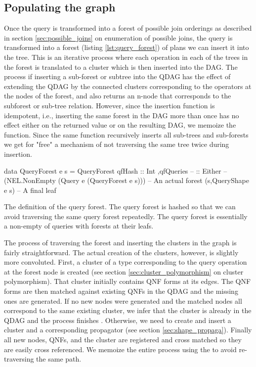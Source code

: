 \subsection{Populating the graph}

Once the query is transformed into a forest of possible join orderings as described
in section \ref{sec:possible_joins} on enumeration of possible joins, the query
is transformed into a forest (listing \ref{lst:query_forest}) of plans we
can insert it into the tree. This is an iterative process where each
operation in each of the trees in the forest is translated to a
cluster which is then inserted into the DAG. The process if inserting
a sub-forest or subtree into the QDAG has
the effect of extending the QDAG by the connected clusters
corresponding to the operators at the nodes of the forest, and also
returns an n-node that corresponds to the subforest or sub-tree
relation. However, since the insertion function is idempotent, i.e.,
inserting the same forest in the DAG more than once has no effect
either on the returned value or on the resulting DAG, we memoize the
function. Since the same function recursively inserts all sub-trees
and sub-forests we get for "free" a mechanism of not traversing the
same tree twice during insertion.

\begin{code}
  \begin{haskellcode}
    data QueryForest e s =
      QueryForest
      { qfHash :: Int
        ,qfQueries --
        :: Either --
        (NEL.NonEmpty (Query e (QueryForest e s))) -- An actual forest
        (s,QueryShape e s) -- A final leaf
      }
  \end{haskellcode}
  \label{lst:query_forest}
  \caption{The definition of the query forest. The
    query forest is hashed so that we can avoid traversing the same
    query forest repeatedly. The query forest is essentially a
    non-empty of queries with forests at their leafs.}
\end{code}

The process of traversing the forest and inserting the clusters in the
graph is fairly straightforward. The actual creation of the clusters,
however, is slightly more convoluted. First, a cluster of a type
corresponding to the query operation at the forest node is created
(see section \ref{sec:cluster_polymorphism} on cluster polymorphism). That
cluster initially contains QNF forms at its edges. The QNF forms are
then matched against existing QNFs in the QDAG and the missing ones
are generated. If no new nodes were generated and the matched nodes
all correspond to the same existing cluster, we infer that the cluster
is already in the QDAG and the process finishes . Otherwise, we need to
create and insert a cluster and a corresponding
propagator (see section \ref{sec:shape_propaga}). Finally all new nodes, QNFs, and
the cluster are registered and cross matched so they are easily cross referenced.
We memoize the entire process using the  to avoid re-traversing the same path.

